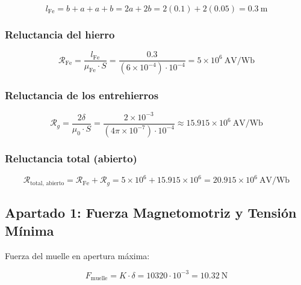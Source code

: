 \documentclass[12pt,a4paper]{article}
\begin{document}
\[
l_{\text{Fe}} = b + a + a + b = 2a + 2b = 2(0.1) + 2(0.05) = \SI{0.3}{\meter}
\]

\subsubsection*{Reluctancia del hierro}

\begin{equation}
    \mathcal{R}_{\text{Fe}} = \frac{l_{\text{Fe}}}{\mu_{\text{Fe}} \cdot S}
    = \frac{0.3}{(6 \times 10^{-4}) \cdot 10^{-4}}
    = 5 \times 10^{6}\ \si{\ampere\volt\per\weber}
\end{equation}

\subsubsection*{Reluctancia de los entrehierros}

\begin{equation}
    \mathcal{R}_g = \frac{2\delta}{\mu_0 \cdot S}
    = \frac{2 \times 10^{-3}}{(4\pi \times 10^{-7}) \cdot 10^{-4}}
    \approx 15.915 \times 10^{6}\ \si{\ampere\volt\per\weber}
\end{equation}

\subsubsection*{Reluctancia total (abierto)}

\begin{equation}
    \mathcal{R}_{\text{total, abierto}} = \mathcal{R}_{\text{Fe}} + \mathcal{R}_g
    = 5 \times 10^{6} + 15.915 \times 10^{6}
    = 20.915 \times 10^{6}\ \si{\ampere\volt\per\weber}
\end{equation}

\begin{center}
\end{center}

\subsection{Apartado 1: Fuerza Magnetomotriz y Tensión Mínima}

Fuerza del muelle en apertura máxima:

\begin{equation}
    F_{\text{muelle}} = K \cdot \delta = 10320 \cdot 10^{-3} = \SI{10.32}{\newton}
\end{equation}
\end{document}

